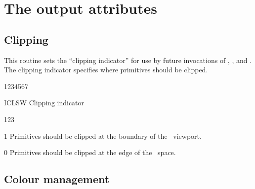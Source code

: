 \section{The output attributes}
%
\subsection{Clipping}
\Action
This routine sets the ``clipping indicator'' for use by future invocations of
, ,  and . The clipping indicator
specifies where primitives should be clipped.
\Pdesc
\begin{DLtt}{1234567}
\item[ICLSW] Clipping indicator
\begin{DLtt}{123}
\item[1] Primitives should be clipped at the boundary of the \NT~viewport.
\item[0] Primitives should be clipped at the edge of the \NDC~space.
\end{DLtt}
\end{DLtt}
%
%
%
\subsection{Colour management}
